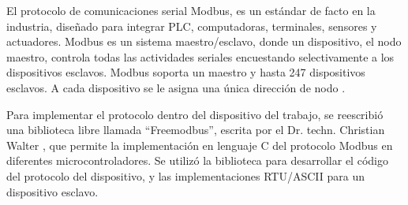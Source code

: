 El protocolo de comunicaciones serial Modbus, es un estándar de facto en la industria, diseñado para integrar PLC, computadoras, terminales, sensores y actuadores. Modbus es un sistema maestro/esclavo, donde un dispositivo, el nodo maestro, controla todas las actividades seriales encuestando selectivamente a los dispositivos esclavos. Modbus soporta un maestro y hasta 247 dispositivos esclavos. A cada dispositivo se le asigna una única dirección de nodo \cite{drury2001control}.

Para implementar el protocolo dentro del dispositivo del trabajo, se reescribió una biblioteca libre llamada \textquotedblleft Freemodbus\textquotedblright , escrita por el Dr. techn. Christian Walter \cite{freegithubb}, que permite la implementación en lenguaje C del protocolo Modbus en diferentes microcontroladores. Se utilizó la biblioteca para desarrollar el código del protocolo del dispositivo, y las implementaciones RTU/ASCII para un dispositivo esclavo.








